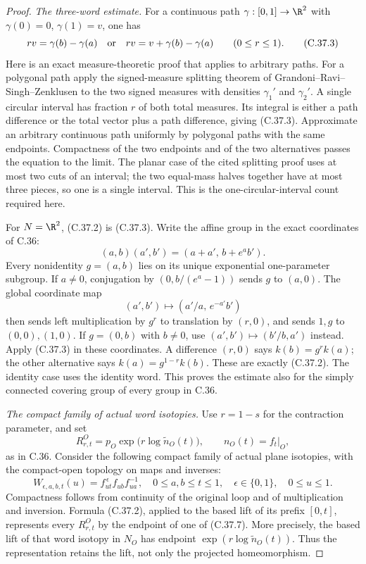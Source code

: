 \begin{proof}
\emph{The three-word estimate.}
For a continuous path $\gamma:[0,1]\to\R^2$ with
$\gamma(0)=0$, $\gamma(1)=v$, one has
\[
 rv=\gamma(b)-\gamma(a)
 \quad\hbox{or}\quad
 rv=v+\gamma(b)-\gamma(a) \qquad(0\leq r\leq1).           \tag{C.37.3}
\]
Here is an exact measure-theoretic proof that applies to arbitrary
paths. For a polygonal path apply the signed-measure splitting
theorem of Grandoni--Ravi--Singh--Zenklusen
\cite[Theorem 4.7 and \S4.3.2]{C_GrandoniRaviSinghZenklusen2014}
to the two signed measures with densities $\gamma_1'$ and
$\gamma_2'$. A single circular interval has fraction $r$ of both
total measures. Its integral is either a path difference or the
total vector plus a path difference, giving (C.37.3).
Approximate an arbitrary continuous path uniformly by polygonal
paths with the same endpoints. Compactness of the two endpoints
and of the two alternatives passes the equation to the limit.
The planar case of the cited splitting proof uses at most two
cuts of an interval; the two equal-mass halves together have at
most three pieces, so one is a single interval. This is the
one-circular-interval count required here.

For $N=\R^2$, (C.37.2) is (C.37.3).
Write the affine group in the exact coordinates of C.36:
\[
 (a,b)(a',b')=(a+a',\,b+e^a b').
                                                        \tag{C.37.4}
\]
Every nonidentity $g=(a,b)$ lies on its unique exponential
one-parameter subgroup. If $a\ne0$, conjugation by
$(0,b/(e^a-1))$ sends $g$ to $(a,0)$.
The global coordinate map
\[
 (a',b')\longmapsto (a'/a,\,e^{-a'}b')
                                                        \tag{C.37.5}
\]
then sends left multiplication by $g^r$ to translation by
$(r,0)$, and sends $1,g$ to $(0,0),(1,0)$.
If $g=(0,b)$ with $b\ne0$, use $(a',b')\mapsto(b'/b,a')$
instead. Apply (C.37.3) in these coordinates.
A difference $(r,0)$ says $k(b)=g^r k(a)$; the other
alternative says $k(a)=g^{1-r}k(b)$. These are exactly
(C.37.2). The identity case uses the identity word.
This proves the estimate also for the simply connected
covering group of every group in C.36.

\emph{The compact family of actual word isotopies.}
Use $r=1-s$ for the contraction parameter, and set
\[
 R^O_{r,t}=p_O\exp\bigl(r\log\widetilde n_O(t)\bigr),
 \qquad n_O(t)=f_t|_O,                                  \tag{C.37.6}
\]
as in C.36. Consider the following compact family of actual
plane isotopies, with the compact-open topology on maps and
inverses:
\[
 W_{\epsilon,a,b,t}(u)
       = f_{ut}^{\,\epsilon} f_{ub}f_{ua}^{-1},
 \quad 0\leq a,b\leq t\leq1,\quad
       \epsilon\in\{0,1\},\quad 0\leq u\leq1 .
                                                        \tag{C.37.7}
\]
Compactness follows from continuity of the original loop and
of multiplication and inversion. Formula (C.37.2), applied to
the based lift of its prefix $[0,t]$, represents every
$R^O_{r,t}$ by the endpoint of one of (C.37.7).
More precisely, the based lift of that word isotopy in $N_O$
has endpoint
$\exp(r\log\widetilde n_O(t))$. Thus the representation retains
the lift, not only the projected homeomorphism.


\end{proof}
